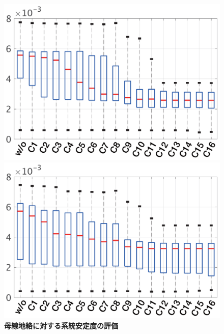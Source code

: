 \documentclass[tombow,dvipdfmx]{corona-a5-1.1}
\begin{document}
\begin{figure}[t!]
  \centering
  {
  \begin{minipage}{0.49\linewidth}
    \centering
    \includegraphics[width = 1.0\linewidth]{figs/boxplotgen}
  \end{minipage}
  \begin{minipage}{0.49\linewidth}
    \centering
    \includegraphics[width = 1.0\linewidth]{figs/boxplotload}
  \end{minipage}
  \medskip
  \caption{\textbf{母線地絡に対する系統安定度の評価} }
  \label{fig:boxplots}
  }
\medskip
\end{figure}
\end{document}
